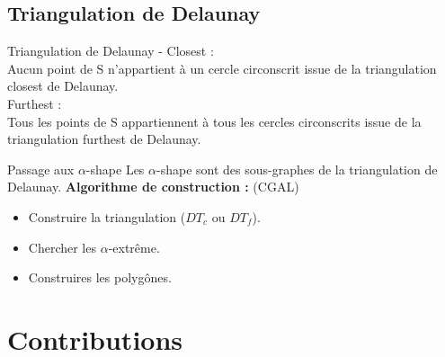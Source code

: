 \documentclass{beamer}
\begin{document}
\subsection{Triangulation de Delaunay}  
\begin{frame}
  \begin{block}{Triangulation de Delaunay - \cite{EdeKirSei83}}
    \alert{Closest :} \\
    \hspace{0.5cm}Aucun point de S n'appartient à un cercle circonscrit issue de la triangulation closest de Delaunay.\\
    \alert{Furthest :} \\
    \hspace{0.5cm}Tous les points de S appartiennent à tous les cercles circonscrits issue de la triangulation furthest de Delaunay.
      
  \end{block}

  \begin{exampleblock}{Passage aux $\alpha$-shape}
    Les $\alpha$-shape sont des sous-graphes de la triangulation de Delaunay.
    \textbf{Algorithme de construction :} (CGAL)
    \begin{itemize}
      \item Construire la triangulation ($DT_c$ ou $DT_f$).
      \item Chercher les $\alpha$-extrême.
      \item Construires les polygônes.
    \end{itemize}
  \end{exampleblock}
  


\end{frame}

\section{Contributions}
\end{document}
